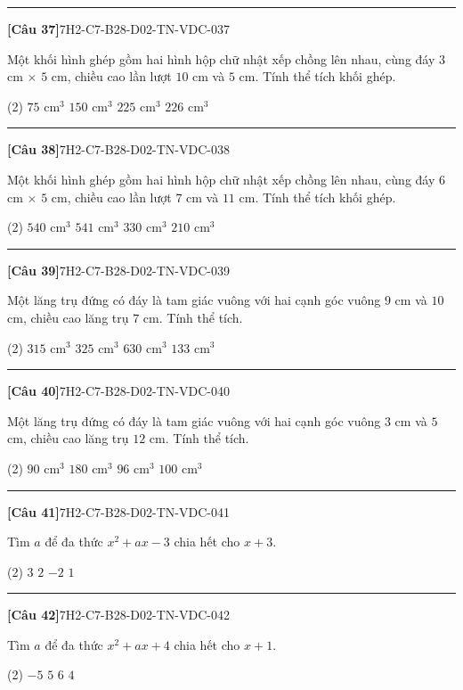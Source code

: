 \documentclass[12pt,a4paper]{article}
\newif\ifloigiai
\newenvironment{cauhoi}[2]{%
  \par\medskip\noindent\rule{\textwidth}{0.4pt}\par\nopagebreak
  \noindent\textbf{[#1]}\hfill{\scriptsize\ttfamily #2}\par\nopagebreak\smallskip}{\par}
\newcommand{\dapan}[1]{\ifloigiai\par\smallskip\noindent\textit{Đáp án:} \textbf{#1}\par\fi}
\begin{document}
\begin{cauhoi}{Câu 37}{7H2-C7-B28-D02-TN-VDC-037}
Một khối hình ghép gồm hai hình hộp chữ nhật xếp chồng lên nhau, cùng đáy $3$ cm $\times$ $5$ cm, chiều cao lần lượt $10$ cm và $5$ cm. Tính thể tích khối ghép.
\begin{tasks}(2)
\task $75\text{ cm}^3$
\task $150\text{ cm}^3$
\task $225\text{ cm}^3$
\task $226\text{ cm}^3$
\end{tasks}
\dapan{C}
\end{cauhoi}
\begin{cauhoi}{Câu 38}{7H2-C7-B28-D02-TN-VDC-038}
Một khối hình ghép gồm hai hình hộp chữ nhật xếp chồng lên nhau, cùng đáy $6$ cm $\times$ $5$ cm, chiều cao lần lượt $7$ cm và $11$ cm. Tính thể tích khối ghép.
\begin{tasks}(2)
\task $540\text{ cm}^3$
\task $541\text{ cm}^3$
\task $330\text{ cm}^3$
\task $210\text{ cm}^3$
\end{tasks}
\dapan{A}
\end{cauhoi}
\begin{cauhoi}{Câu 39}{7H2-C7-B28-D02-TN-VDC-039}
Một lăng trụ đứng có đáy là tam giác vuông với hai cạnh góc vuông $9$ cm và $10$ cm, chiều cao lăng trụ $7$ cm. Tính thể tích.
\begin{tasks}(2)
\task $315\text{ cm}^3$
\task $325\text{ cm}^3$
\task $630\text{ cm}^3$
\task $133\text{ cm}^3$
\end{tasks}
\dapan{A}
\end{cauhoi}
\begin{cauhoi}{Câu 40}{7H2-C7-B28-D02-TN-VDC-040}
Một lăng trụ đứng có đáy là tam giác vuông với hai cạnh góc vuông $3$ cm và $5$ cm, chiều cao lăng trụ $12$ cm. Tính thể tích.
\begin{tasks}(2)
\task $90\text{ cm}^3$
\task $180\text{ cm}^3$
\task $96\text{ cm}^3$
\task $100\text{ cm}^3$
\end{tasks}
\dapan{A}
\end{cauhoi}
\begin{cauhoi}{Câu 41}{7H2-C7-B28-D02-TN-VDC-041}
Tìm $a$ để đa thức $x^{2}+ax-3$ chia hết cho $x+3$.
\begin{tasks}(2)
\task $3$
\task $2$
\task $-2$
\task $1$
\end{tasks}
\dapan{B}
\end{cauhoi}
\begin{cauhoi}{Câu 42}{7H2-C7-B28-D02-TN-VDC-042}
Tìm $a$ để đa thức $x^{2}+ax+4$ chia hết cho $x+1$.
\begin{tasks}(2)
\task $-5$
\task $5$
\task $6$
\task $4$
\end{tasks}
\dapan{B}
\end{cauhoi}
\end{document}
